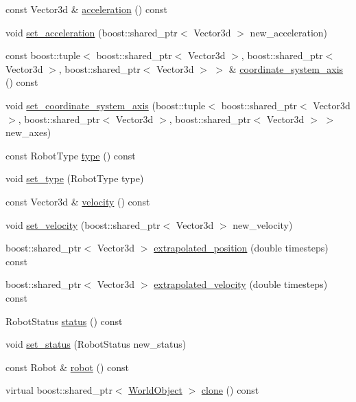\begin{CompactItemize}
\item 
const Vector3d \& \hyperlink{class_robot_data_a65f6448e4ec4061b6300283f3cdd8da}{acceleration} () const 
\item 
void \hyperlink{class_robot_data_8799d69f51da76c16da773ca4cf8a8c5}{set\_\-acceleration} (boost::shared\_\-ptr$<$ Vector3d $>$ new\_\-acceleration)
\item 
const boost::tuple$<$ boost::shared\_\-ptr$<$ Vector3d $>$, boost::shared\_\-ptr$<$ Vector3d $>$, boost::shared\_\-ptr$<$ Vector3d $>$ $>$ \& \hyperlink{class_robot_data_e093fc063e47ad844c20a9332c5bea6a}{coordinate\_\-system\_\-axis} () const 
\item 
void \hyperlink{class_robot_data_26807404a2503711944c55f4ed75dd2e}{set\_\-coordinate\_\-system\_\-axis} (boost::tuple$<$ boost::shared\_\-ptr$<$ Vector3d $>$, boost::shared\_\-ptr$<$ Vector3d $>$, boost::shared\_\-ptr$<$ Vector3d $>$ $>$ new\_\-axes)
\item 
const RobotType \hyperlink{class_robot_data_b83255012ce788fdbf9b277c775e0240}{type} () const 
\item 
void \hyperlink{class_robot_data_ac8292bb51a92b2c5c9a6a6e00529fce}{set\_\-type} (RobotType type)
\item 
const Vector3d \& \hyperlink{class_robot_data_933da54224245d40afb0ed1b2446599c}{velocity} () const 
\item 
void \hyperlink{class_robot_data_4a45b387b65f7924015075bdcea2b00a}{set\_\-velocity} (boost::shared\_\-ptr$<$ Vector3d $>$ new\_\-velocity)
\item 
boost::shared\_\-ptr$<$ Vector3d $>$ \hyperlink{class_robot_data_5604cb6b35b70e6d70da6429349eec65}{extrapolated\_\-position} (double timesteps) const 
\item 
boost::shared\_\-ptr$<$ Vector3d $>$ \hyperlink{class_robot_data_37848feb0ad585292fd126465e126f67}{extrapolated\_\-velocity} (double timesteps) const 
\item 
RobotStatus \hyperlink{class_robot_data_9c8d2252555f1d5866c0332a80e82685}{status} () const 
\item 
void \hyperlink{class_robot_data_4a471efa8f681d3978f35f84caa77efd}{set\_\-status} (RobotStatus new\_\-status)
\item 
const Robot \& \hyperlink{class_robot_data_7e08f6f226617e6fda8f4b27e2622959}{robot} () const 
\item 
virtual boost::shared\_\-ptr$<$ \hyperlink{class_world_object}{WorldObject} $>$ \hyperlink{class_robot_data_81b5c3ba1f959f41ff3a9cb8067d75cb}{clone} () const 
\end{CompactItemize}

